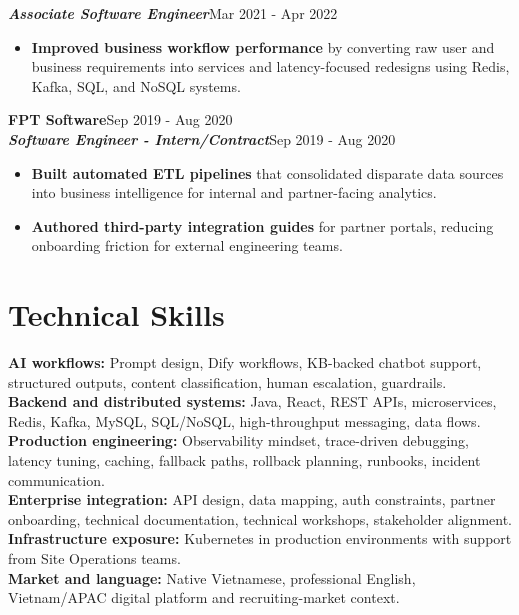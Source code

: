 \documentclass[10pt,letterpaper]{article}
\newcommand{\role}[2]{%
  \textit{\textbf{#1}}\hfill {\small\textcolor{textgray}{#2}}\\[-2pt]
}
\begin{document}
\role{Associate Software Engineer}{Mar 2021 - Apr 2022}
\begin{itemize}
  \item \textbf{Improved business workflow performance} by converting raw user and business requirements into services and latency-focused redesigns using Redis, Kafka, SQL, and NoSQL systems.
\end{itemize}

\textbf{FPT Software}\hfill {\small\textcolor{textgray}{Sep 2019 - Aug 2020}}\\
\role{Software Engineer - Intern/Contract}{Sep 2019 - Aug 2020}
\begin{itemize}
  \item \textbf{Built automated ETL pipelines} that consolidated disparate data sources into business intelligence for internal and partner-facing analytics.
  \item \textbf{Authored third-party integration guides} for partner portals, reducing onboarding friction for external engineering teams.
\end{itemize}

\section*{Technical Skills}
\textbf{AI workflows:} Prompt design, Dify workflows, KB-backed chatbot support, structured outputs, content classification, human escalation, guardrails.\\
\textbf{Backend and distributed systems:} Java, React, REST APIs, microservices, Redis, Kafka, MySQL, SQL/NoSQL, high-throughput messaging, data flows.\\
\textbf{Production engineering:} Observability mindset, trace-driven debugging, latency tuning, caching, fallback paths, rollback planning, runbooks, incident communication.\\
\textbf{Enterprise integration:} API design, data mapping, auth constraints, partner onboarding, technical documentation, technical workshops, stakeholder alignment.\\
\textbf{Infrastructure exposure:} Kubernetes in production environments with support from Site Operations teams.\\
\textbf{Market and language:} Native Vietnamese, professional English, Vietnam/APAC digital platform and recruiting-market context.
\end{document}
